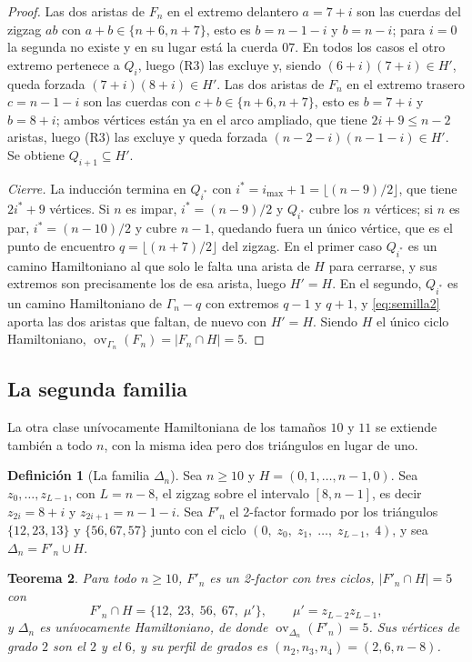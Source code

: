 \documentclass[11pt,a4paper]{article}
\newtheorem{teorema}{Teorema}[section]
\theoremstyle{definition}
\newtheorem{definicion}[teorema]{Definición}
\theoremstyle{remark}
\newcommand{\ov}{\operatorname{ov}}
\begin{document}
\begin{proof}
Las dos aristas de $F_n$ en el extremo delantero $a=7+i$ son las cuerdas del zigzag $ab$ con $a+b\in\{n+6,n+7\}$, esto es $b=n-1-i$ y $b=n-i$; para $i=0$ la segunda no existe y en su lugar está la cuerda $07$. En todos los casos el otro extremo pertenece a $Q_i$, luego (R3) las excluye y, siendo $(6+i)(7+i)\in H'$, queda forzada $(7+i)(8+i)\in H'$. Las dos aristas de $F_n$ en el extremo trasero $c=n-1-i$ son las cuerdas con $c+b\in\{n+6,n+7\}$, esto es $b=7+i$ y $b=8+i$; ambos vértices están ya en el arco ampliado, que tiene $2i+9\le n-2$ aristas, luego (R3) las excluye y queda forzada $(n-2-i)(n-1-i)\in H'$. Se obtiene $Q_{i+1}\subseteq H'$.

\emph{Cierre.} La inducción termina en $Q_{i^*}$ con $i^*=i_{\max}+1=\lfloor (n-9)/2\rfloor$, que tiene $2i^*+9$ vértices. Si $n$ es impar, $i^*=(n-9)/2$ y $Q_{i^*}$ cubre los $n$ vértices; si $n$ es par, $i^*=(n-10)/2$ y cubre $n-1$, quedando fuera un único vértice, que es el punto de encuentro $q=\lfloor (n+7)/2\rfloor$ del zigzag. En el primer caso $Q_{i^*}$ es un camino Hamiltoniano al que solo le falta una arista de $H$ para cerrarse, y sus extremos son precisamente los de esa arista, luego $H'=H$. En el segundo, $Q_{i^*}$ es un camino Hamiltoniano de $\Gamma_n-q$ con extremos $q-1$ y $q+1$, y \eqref{eq:semilla2} aporta las dos aristas que faltan, de nuevo con $H'=H$. Siendo $H$ el único ciclo Hamiltoniano, $\ov_{\Gamma_n}(F_n)=|F_n\cap H|=5$.
\end{proof}

\subsection{La segunda familia}\label{sub:delta}

La otra clase unívocamente Hamiltoniana de los tamaños $10$ y $11$ se extiende también a todo $n$, con la misma idea pero dos triángulos en lugar de uno.

\begin{definicion}[La familia $\Delta_n$]\label{def:delta}
Sea $n\ge10$ y $H=(0,1,\dots,n-1,0)$. Sea $z_0,\dots,z_{L-1}$, con $L=n-8$, el zigzag sobre el intervalo $[8,n-1]$, es decir $z_{2i}=8+i$ y $z_{2i+1}=n-1-i$. Sea $F'_n$ el 2-factor formado por los triángulos $\{12,23,13\}$ y $\{56,67,57\}$ junto con el ciclo $(0,\;z_0,\;z_1,\;\dots,\;z_{L-1},\;4)$, y sea $\Delta_n=F'_n\cup H$.
\end{definicion}

\begin{teorema}\label{thm:delta}
Para todo $n\ge10$, $F'_n$ es un 2-factor con \emph{tres} ciclos, $|F'_n\cap H|=5$ con
\[
F'_n\cap H=\{12,\;23,\;56,\;67,\;\mu'\},\qquad \mu'=z_{L-2}z_{L-1},
\]
y $\Delta_n$ es unívocamente Hamiltoniano, de donde $\ov_{\Delta_n}(F'_n)=5$. Sus vértices de grado $2$ son el $2$ y el $6$, y su perfil de grados es $(n_2,n_3,n_4)=(2,6,n-8)$.
\end{teorema}
\end{document}
